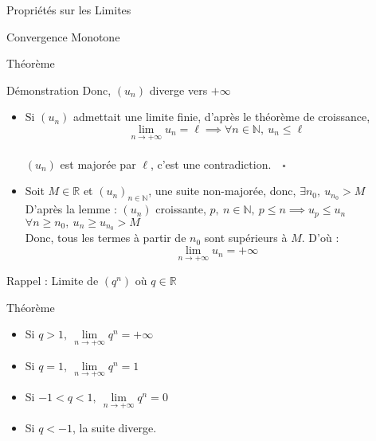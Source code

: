 \documentclass{cours}
\begin{document}
\begin{Gpartie}{Propriétés sur les Limites}
\begin{Spartie}{Convergence Monotone}
\begin{SSpartie}{Théorème}
\begin{SSSpartie}{Démonstration}
                    Donc, $(u_n)$ diverge vers $+\infty$
                    \begin{itemize}
                        \item Si $(u_n)$ admettait une limite finie, d'après le théorème de croissance, 
                        \[\lim\limits_{n\to +\infty}u_n=\ell\implies\forall n\in\mathbb{N},\ u_n\leq\ell\] \\ $(u_n)$ est majorée par $\ell$, c'est une contradiction.$\quad\square$
                        \\[2ex]
                        \item Soit $M\in\mathbb{R}$ et $(u_n)_{n\in\mathbb{N}}$, une suite non-majorée, donc, $\exists n_0,\ u_{n_0}>M$ \\ D'après la lemme : $(u_n)$ croissante, $p,\ n\in\mathbb{N},\ p\leq n\implies u_p\leq u_n$ \\ $\forall n\geq n_0,\ u_n\geq u_{n_0}>M$ \\ Donc, tous les termes à partir de $n_0$ sont supérieurs à $M$. D'où : \[\lim\limits_{n\to +\infty}u_n=+\infty\]
                    \end{itemize}
                \end{SSSpartie}
            \end{SSpartie}
        \end{Spartie}
        \begin{Spartie}{Rappel : Limite de $\left(q^n\right)$ où $q\in\mathbb{R}$} 
            \begin{SSpartie}{Théorème} 
                \begin{itemize}
                    \setlength\itemsep{0.5em}
                    \item Si $q>1,~\lim\limits_{n\to+\infty}q^n=+\infty$
                    \item Si $q=1,~\lim\limits_{n\to+\infty}q^n=1$
                    \item Si $-1<q<1,~\lim\limits_{n\to+\infty}q^n=0$
                    \item Si $q<-1$, la suite diverge.
                \end{itemize}
            \end{SSpartie}
        \end{Spartie}
    \end{Gpartie}
    \pagebreak
\end{document}
